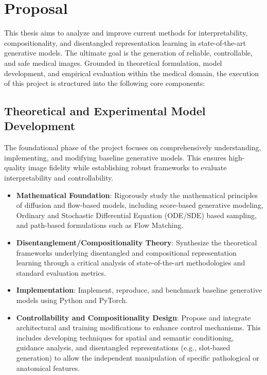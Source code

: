 \chapter{Proposal}\label{ch:proposal}

This thesis aims to analyze and improve current methods for interpretability, compositionality, and disentangled representation learning in state-of-the-art generative models. The ultimate goal is the generation of reliable, controllable, and safe medical images. Grounded in theoretical formulation, model development, and empirical evaluation within the medical domain, the execution of this project is structured into the following core components:

\section{Theoretical and Experimental Model Development} 
The foundational phase of the project focuses on comprehensively understanding, implementing, and modifying baseline generative models. This ensures high-quality image fidelity while establishing robust frameworks to evaluate interpretability and controllability.
\begin{itemize}
    \item \textbf{Mathematical Foundation}: Rigorously study the mathematical principles of diffusion and flow-based models, including score-based generative modeling, Ordinary and Stochastic Differential Equation (ODE/SDE) based sampling, and path-based formulations such as Flow Matching.
    \item \textbf{Disentanglement/Compositionality Theory}: Synthesize the theoretical frameworks underlying disentangled and compositional representation learning through a critical analysis of state-of-the-art methodologies and standard evaluation metrics.
    \item \textbf{Implementation}: Implement, reproduce, and benchmark baseline generative models using Python and PyTorch.
    \item \textbf{Controllability and Compositionality Design}: Propose and integrate architectural and training modifications to enhance control mechanisms. This includes developing techniques for spatial and semantic conditioning, guidance analysis, and disentangled representations (e.g., slot-based generation) to allow the independent manipulation of specific pathological or anatomical features.
\end{itemize} 


